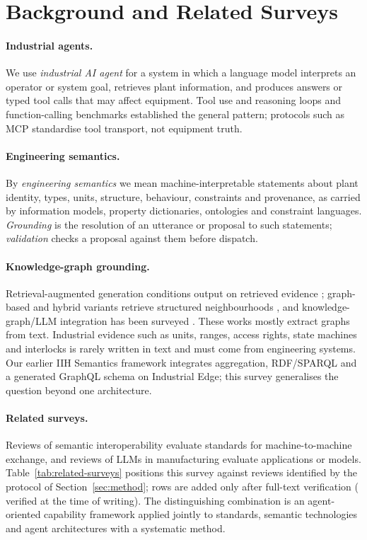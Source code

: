 \section{Background and Related Surveys}
\label{sec:background}

\paragraph{Industrial agents.} We use \emph{industrial AI agent} for a system in which a
language model interprets an operator or system goal, retrieves plant information, and
produces answers or typed tool calls that may affect equipment. Tool use and reasoning
loops \cite{schick2023toolformer,yao2023react} and function-calling benchmarks
\cite{patil2024gorilla} established the general pattern; protocols such as MCP \cite{mcp}
standardise tool transport, not equipment truth.

\paragraph{Engineering semantics.} By \emph{engineering semantics} we mean
machine-interpretable statements about plant identity, types, units, structure,
behaviour, constraints and provenance, as carried by information models, property
dictionaries, ontologies and constraint languages. \emph{Grounding} is the resolution of an
utterance or proposal to such statements; \emph{validation} checks a proposal against
them before dispatch.

\paragraph{Knowledge-graph grounding.} Retrieval-augmented generation conditions output on
retrieved evidence \cite{lewis2020rag}; graph-based and hybrid variants retrieve structured
neighbourhoods \cite{edge2024graphrag,sarmah2024hybridrag}, and knowledge-graph/LLM
integration has been surveyed \cite{pan2024unifying}. These works mostly extract graphs from
text. Industrial evidence such as units, ranges, access rights, state machines and
interlocks is rarely written in text and must come from engineering systems. Our earlier
IIH Semantics framework \cite{todkar2025semanticitot} integrates \opcua{} aggregation,
RDF/SPARQL and a generated GraphQL schema on Industrial Edge; this survey generalises the
question beyond one architecture.

\paragraph{Related surveys.} Reviews of semantic interoperability evaluate standards for
machine-to-machine exchange, and reviews of LLMs in manufacturing evaluate applications or
models. Table~\ref{tab:related-surveys} positions this survey against reviews identified
by the protocol of Section~\ref{sec:method}; rows are added only after full-text
verification (\RelatedSurveysVerified{} verified at the time of writing). The
distinguishing combination is an agent-oriented capability framework applied jointly to
standards, semantic technologies and agent architectures with a systematic method.


